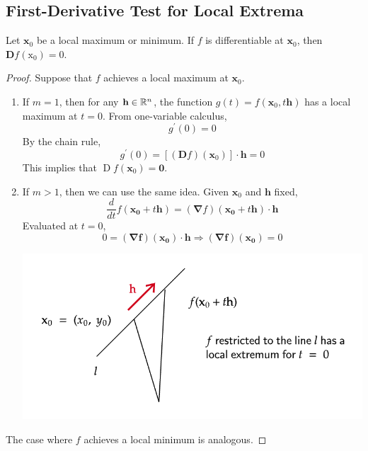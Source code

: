 \subsection{First-Derivative Test for Local Extrema}
\begin{thm}
   Let $\mathbf{x}_0$ be a local maximum or minimum. If $f$ is differentiable at $\mathbf{x}_0$, then $\mathbf{D} f\left(\mathrm{x}_0\right)=0$.
\end{thm}

\begin{proof}
   Suppose that $f$ achieves a local maximum at $\mathbf{x}_0$.
   \begin{enumerate}
       \item If $m = 1$, then for any $\mathbf{h} \in \mathbb{R}^n$, the function $g(t) = f(\mathbf{x}_0, t\mathbf{h})$ has a local maximum at $t = 0$. From one-variable calculus,
       \[g^{\prime}(0) = 0\]
       By the chain rule,
       \[g^{\prime}(0)=\left[(\mathbf{D} f)\left(\mathbf{x}_0\right)\right] \cdot \mathbf{h} = 0\]
       This implies that $\operatorname{D} f\left(\mathbf{x}_0\right)=\mathbf{0}$.
        \item If $m > 1$, then we can use the same idea. Given $\mathbf{x}_0$ and $\mathbf{h}$ fixed,
        \[\frac{d}{d t} f\left(\mathbf{x_0}+t \mathbf{h}\right)=(\mathbf{\nabla} f)\left(\mathbf{x_0}+t \mathbf{h}\right) \cdot \mathbf{h}\]
        Evaluated at $t = 0$,
        \[0=(\mathbf{\nabla f})\left(\mathbf{x_0}\right) \cdot \mathbf{h} \Rightarrow(\mathbf{\nabla f})\left(\mathbf{x_0}\right)=0\]
         \begin{center}
            \includegraphics[width=0.9\linewidth]{figures/wk-3/fig-36.png}
        \end{center}
   \end{enumerate}
   The case where $f$ achieves a local minimum is analogous.
\end{proof}


